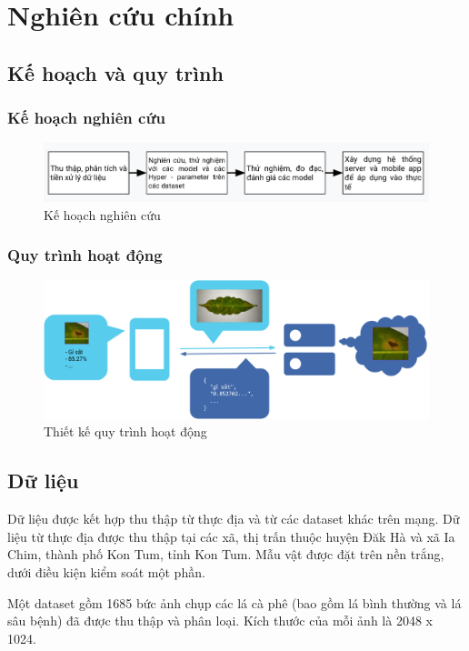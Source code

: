 \documentclass[a4paper,14pt]{extarticle}
\begin{document}
\section{Nghiên cứu chính}
	\subsection{Kế hoạch và quy trình}
	\subsubsection{Kế hoạch nghiên cứu}

	\begin{figure}[H]
		\centering
		\includegraphics[scale=0.6]{images/plans.png}
		\caption{Kế hoạch nghiên cứu}
	\end{figure}

	\subsubsection{Quy trình hoạt động}
	\begin{figure}[H]
		\centering
		\includegraphics[scale=0.4]{images/chart.png}
		\caption{Thiết kế quy trình hoạt động}
	\end{figure}

	\subsection{Dữ liệu}
	Dữ liệu được kết hợp thu thập từ thực địa và từ các dataset khác trên mạng. Dữ liệu từ thực địa được thu thập tại các xã, thị trấn thuộc huyện Đăk Hà và xã Ia Chim, thành phố Kon Tum, tỉnh Kon Tum. Mẫu vật được đặt trên nền trắng, dưới điều kiện kiểm soát một phần.

	Một dataset gồm 1685 bức ảnh chụp các lá cà phê (bao gồm lá bình thường và lá sâu bệnh) đã được thu thập và phân loại. Kích thước của mỗi ảnh là 2048 x 1024.
\end{document}
